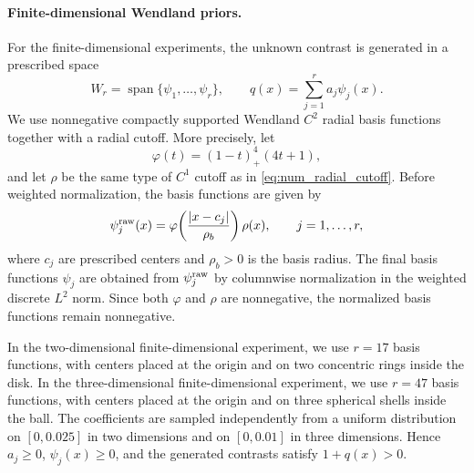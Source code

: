 \documentclass{article}
\numberwithin{equation}{section}
\theoremstyle{plain}
\begin{document}
\paragraph{Finite-dimensional Wendland priors.}
For the finite-dimensional experiments, the unknown contrast is generated in a prescribed space
\begin{equation}\label{eq:num_finite_prior}
	W_r=\operatorname{span}\{\psi_1,\ldots,\psi_r\},
	\qquad
	q(x)=\sum_{j=1}^{r}a_j\psi_j(x).
\end{equation}
We use nonnegative compactly supported Wendland $C^2$ radial basis functions together with a radial cutoff.  More precisely, let
\begin{equation}\label{eq:num_wendland_profile}
	\varphi(t)=(1-t)_+^4(4t+1),
\end{equation}
and let $\rho$ be the same type of $C^1$ cutoff as in \eqref{eq:num_radial_cutoff}.  Before weighted normalization, the basis functions are given by
\begin{equation}\label{eq:num_wendland_basis}
	\psi_j^{\rm raw}(x)
	=
	\varphi\!\left(\frac{|x-c_j|}{\rho_b}\right)\rho(x),
	\qquad j=1,\ldots,r,
\end{equation}
where $c_j$ are prescribed centers and $\rho_b>0$ is the basis radius.  The final basis functions $\psi_j$ are obtained from $\psi_j^{\rm raw}$ by columnwise normalization in the weighted discrete $L^2$ norm.  Since both $\varphi$ and $\rho$ are nonnegative, the normalized basis functions remain nonnegative.

In the two-dimensional finite-dimensional experiment, we use $r=17$ basis functions, with centers placed at the origin and on two concentric rings inside the disk.  In the three-dimensional finite-dimensional experiment, we use $r=47$ basis functions, with centers placed at the origin and on three spherical shells inside the ball.  The coefficients are sampled independently from a uniform distribution on $[0,0.025]$ in two dimensions and on $[0,0.01]$ in three dimensions. Hence $a_j\ge 0$, $\psi_j(x)\ge 0$, and the generated contrasts satisfy $1+q(x)>0$.
\end{document}
